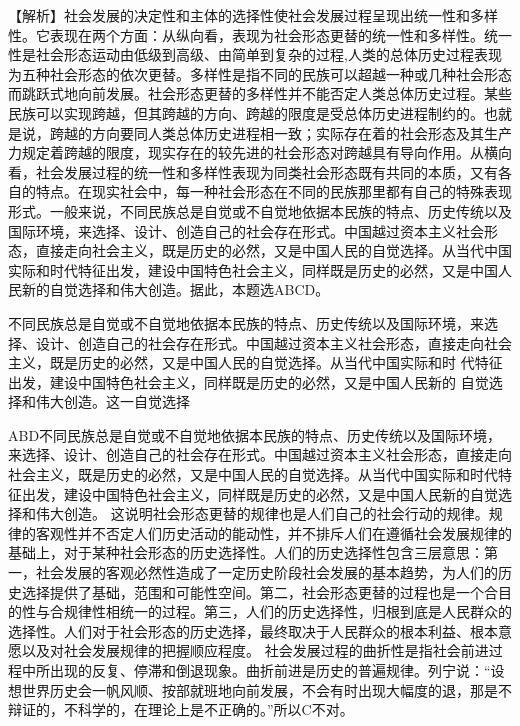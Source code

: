 \begin{solution}【解析】社会发展的决定性和主体的选择性使社会发展过程呈现出统一性和多样性。它表现在两个方面：从纵向看，表现为社会形态更替的统一性和多样性。统一性是社会形态运动由低级到高级、由简单到复杂的过程,人类的总体历史过程表现为五种社会形态的依次更替。多样性是指不同的民族可以超越一种或几种社会形态而跳跃式地向前发展。社会形态更替的多样性并不能否定人类总体历史过程。某些民族可以实现跨越，但其跨越的方向、跨越的限度是受总体历史进程制约的。也就是说，跨越的方向要同人类总体历史进程相一致；实际存在着的社会形态及其生产力规定着跨越的限度，现实存在的较先进的社会形态对跨越具有导向作用。从横向看，社会发展过程的统一性和多样性表现为同类社会形态既有共同的本质，又有各自的特点。在现实社会中，每一种社会形态在不同的民族那里都有自己的特殊表现形式。一般来说，不同民族总是自觉或不自觉地依据本民族的特点、历史传统以及国际环境，来选择、设计、创造自己的社会存在形式。中国越过资本主义社会形态，直接走向社会主义，既是历史的必然，又是中国人民的自觉选择。从当代中国实际和时代特征出发，建设中国特色社会主义，同样既是历史的必然，又是中国人民新的自觉选择和伟大创造。据此，本题选ABCD。
\end{solution}
\question 不同民族总是自觉或不自觉地依据本民族的特点、历史传统以及国际环境，来选择、设计、创造自己的社会存在形式。中国越过资本主义社会形态，直接走向社会主义，既是历史的必然，又是中国人民的自觉选择。从当代中国实际和时
代特征出发，建设中国特色社会主义，同样既是历史的必然，又是中国人民新的
自觉选择和伟大创造。这一自觉选择
\par{}
\begin{solution}ABD不同民族总是自觉或不自觉地依据本民族的特点、历史传统以及国际环境，来选择、设计、创造自己的社会存在形式。中国越过资本主义社会形态，直接走向社会主义，既是历史的必然，又是中国人民的自觉选择。从当代中国实际和时代特征出发，建设中国特色社会主义，同样既是历史的必然，又是中国人民新的自觉选择和伟大创造。
这说明社会形态更替的规律也是人们自己的社会行动的规律。规律的客观性并不否定人们历史活动的能动性，并不排斥人们在遵循社会发展规律的基础上，对于某种社会形态的历史选择性。人们的历史选择性包含三层意思：第一，社会发展的客观必然性造成了一定历史阶段社会发展的基本趋势，为人们的历史选择提供了基础，范围和可能性空间。第二，社会形态更替的过程也是一个合目的性与合规律性相统一的过程。第三，人们的历史选择性，归根到底是人民群众的选择性。人们对于社会形态的历史选择，最终取决于人民群众的根本利益、根本意愿以及对社会发展规律的把握顺应程度。
社会发展过程的曲折性是指社会前进过程中所出现的反复、停滞和倒退现象。曲折前进是历史的普遍规律。列宁说：``设想世界历史会一帆风顺、按部就班地向前发展，不会有时出现大幅度的退，那是不辩证的，不科学的，在理论上是不正确的。''所以C不对。
\end{solution}

